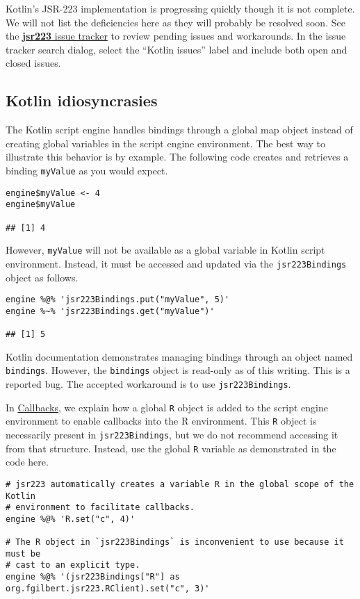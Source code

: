 \documentclass[
article,
11pt, %
a4paper, %
oneside, %
headinclude,footinclude, %
]{scrartcl}
\theoremstyle{definition} %
\theoremstyle{plain} %
\theoremstyle{remark} %
\newcommand{\pkg}[1]{\textbf{#1}}
\newcommand{\code}[1]{\texttt{#1}}
\begin{document}
Kotlin's JSR-223 implementation is progressing quickly though it is not complete. We will not list the deficiencies here as they will probably be resolved soon. See the \href{https://github.com/floidgilbert/jsr223/issues}{\pkg{jsr223} issue tracker} to review pending issues and workarounds. In the issue tracker search dialog, select the ``Kotlin issues'' label and include both open and closed issues.

\hypertarget{kotlin-idiosyncrasies}{}
\subsection{Kotlin idiosyncrasies}

The Kotlin script engine handles bindings through a global map object instead of creating global variables in the script engine environment. The best way to illustrate this behavior is by example. The following code creates and retrieves a binding \code{myValue} as you would expect.

\begin{verbatim}
engine$myValue <- 4
engine$myValue

## [1] 4
\end{verbatim}
However, \code{myValue} will not be available as a global variable in Kotlin script environment. Instead, it must be accessed and updated via the \code{jsr223Bindings} object as follows.

\begin{verbatim}
engine %@% 'jsr223Bindings.put("myValue", 5)'
engine %~% 'jsr223Bindings.get("myValue")'

## [1] 5
\end{verbatim}

Kotlin documentation demonstrates managing bindings through an object named \code{bindings}. However, the \code{bindings} object is read-only as of this writing. This is a reported bug. The accepted workaround is to use \code{jsr223Bindings}.

In \hyperlink{callbacks}{Callbacks}, we explain how a global \code{R} object is added to the script engine environment to enable callbacks into the R environment. This \code{R} object is necessarily present in \code{jsr223Bindings}, but we do not recommend accessing it from that structure. Instead, use the global \code{R} variable as demonstrated in the code here.

\begin{verbatim}
# jsr223 automatically creates a variable R in the global scope of the Kotlin
# environment to facilitate callbacks.
engine %@% 'R.set("c", 4)'

# The R object in `jsr223Bindings` is inconvenient to use because it must be
# cast to an explicit type.
engine %@% '(jsr223Bindings["R"] as org.fgilbert.jsr223.RClient).set("c", 3)'
\end{verbatim}
\end{document}
